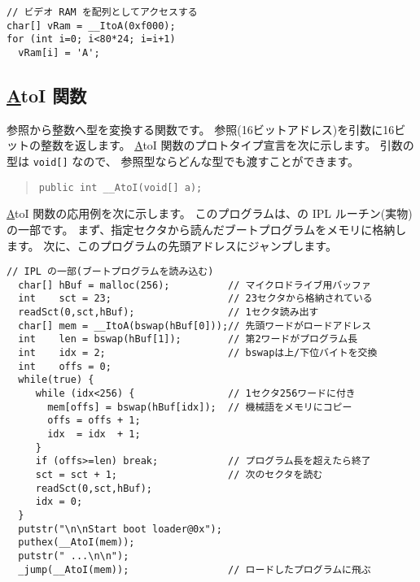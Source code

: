 \begin{mylist}
\begin{verbatim}
// ビデオ RAM を配列としてアクセスする
char[] vRam = __ItoA(0xf000);
for (int i=0; i<80*24; i=i+1)
  vRam[i] = 'A';
\end{verbatim}
\end{mylist}

\subsection{\ul \ul AtoI 関数}

参照から整数へ型を変換する関数です。
参照(16ビットアドレス)を引数に16ビットの整数を返します。
\ul \ul AtoI 関数のプロトタイプ宣言を次に示します。
引数の型は \verb/void[]/ なので、
参照型ならどんな型でも渡すことができます。

\begin{quote}
\begin{verbatim}
public int __AtoI(void[] a);
\end{verbatim}
\end{quote}

\ul \ul AtoI 関数の応用例を次に示します。
このプログラムは、\tac の IPL ルーチン(実物)の一部です。
まず、指定セクタから読んだブートプログラムをメモリに格納します。
次に、このプログラムの先頭アドレスにジャンプします。

\begin{mylist}
\begin{verbatim}
// IPL の一部(ブートプログラムを読み込む)
  char[] hBuf = malloc(256);          // マイクロドライブ用バッファ
  int    sct = 23;                    // 23セクタから格納されている
  readSct(0,sct,hBuf);                // 1セクタ読み出す
  char[] mem = __ItoA(bswap(hBuf[0]));// 先頭ワードがロードアドレス
  int    len = bswap(hBuf[1]);        // 第2ワードがプログラム長
  int    idx = 2;                     // bswapは上/下位バイトを交換
  int    offs = 0;
  while(true) {
     while (idx<256) {                // 1セクタ256ワードに付き
       mem[offs] = bswap(hBuf[idx]);  // 機械語をメモリにコピー
       offs = offs + 1;
       idx  = idx  + 1;
     }
     if (offs>=len) break;            // プログラム長を超えたら終了
     sct = sct + 1;                   // 次のセクタを読む
     readSct(0,sct,hBuf);
     idx = 0;
  }
  putstr("\n\nStart boot loader@0x");
  puthex(__AtoI(mem));
  putstr(" ...\n\n");
  _jump(__AtoI(mem));                 // ロードしたプログラムに飛ぶ
\end{verbatim}
\end{mylist}

